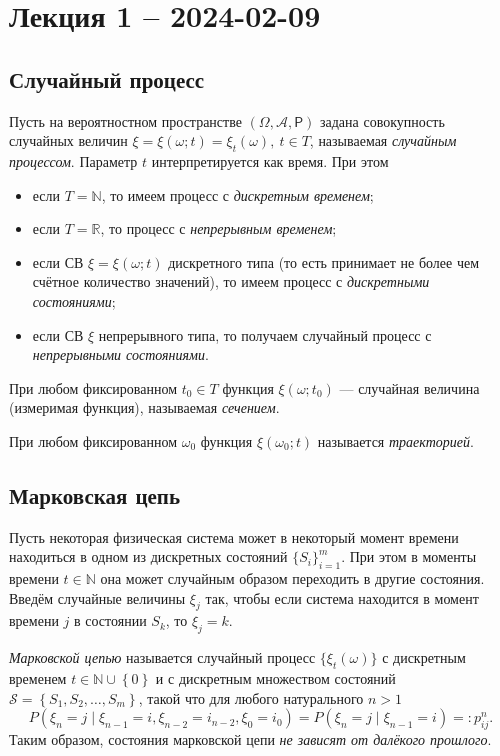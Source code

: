 \section{Лекция 1 -- 2024-02-09}
\subsection{Случайный процесс}
\begin{definition}
  Пусть на вероятностном пространстве $(\Omega, \mathscr A, \mathsf P)$ задана совокупность случайных величин
  $\xi = \xi(\omega; t) = \xi_t(\omega),\ t \in T$, называемая \emph{случайным процессом}. Параметр 
  $t$ интерпретируется как время. При этом

  \begin{itemize}[label=--]
    \item если $T = \mathbb{N}$, то имеем процесс с \emph{дискретным временем};
    \item если $T = \mathbb{R}$, то процесс с \emph{непрерывным временем};
    \item если СВ $\xi=\xi(\omega; t)$ дискретного типа (то есть принимает не
      более чем счётное количество значений), то имеем процесс с \emph{дискретными состояниями};
    \item если СВ $\xi$ непрерывного типа, то получаем случайный процесс с \emph{непрерывными состояниями}.
  \end{itemize}

  При любом фиксированном $t_0 \in T$ функция $\xi(\omega; t_0)$ --- случайная
  величина (измеримая функция), называемая \emph{сечением}.

  При любом фиксированном $\omega_0$ функция $\xi(\omega_0; t)$ называется \emph{траекторией}.
\end{definition}


\subsection{Марковская цепь}
  Пусть некоторая физическая система может в некоторый момент времени находиться в одном из дискретных состояний
  $\{S_i\}_{i=1}^m$. При этом в моменты времени $t \in \mathbb{N}$ она может случайным образом
  переходить в другие состояния. Введём случайные величины $\xi_j$ так, чтобы если система
  находится в момент времени $j$ в состоянии $S_k$, то $\xi_j = k$.

\begin{definition}
  \emph{Марковской цепью} называется случайный процесс $\{\xi_t(\omega)\}$ с дискретным временем
  $t \in \mathbb{N} \cup \left\{ 0 \right\} $ и с дискретным множеством состояний
  $\mathscr{S} = \left\{ S_1, S_2, \dots, S_m \right\} $, такой что для любого
  натурального $ n > 1 $
  \[
    P(\xi_n = j \mid \xi_{n-1} = i, \xi_{n-2} = i_{n-2}, \xi_0 = i_0) =
    P(\xi_n=j \mid \xi_{n-1} = i) =: p_{ij}^n.
  \]
  Таким образом, состояния марковской цепи \textsl{не зависят от далёкого
  прошлого}.
\end{definition}

